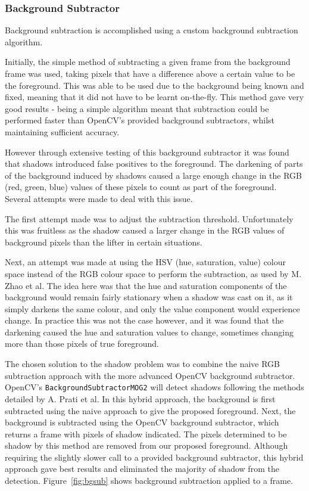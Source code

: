 \subsubsection{Background Subtractor}
\label{subsec:bgsub}

Background subtraction is accomplished using a custom background subtraction algorithm.

Initially, the simple method of subtracting a given frame from the background frame was used, taking pixels that have a difference above a certain value to be the foreground. This was able to be used due to the background being known and fixed, meaning that it did not have to be learnt on-the-fly. This method gave very good results - being a simple algorithm meant that subtraction could be performed faster than OpenCV's provided background subtractors, whilst maintaining sufficient accuracy.

However through extensive testing of this background subtractor it was found that shadows introduced false positives to the foreground. The darkening of parts of the background induced by shadows caused a large enough change in the RGB (red, green, blue) values of these pixels to count as part of the foreground. Several attempts were made to deal with this issue.

The first attempt made was to adjust the subtraction threshold. Unfortunately this was fruitless as the shadow caused a larger change in the RGB values of background pixels than the lifter in certain situations.

Next, an attempt was made at using the HSV (hue, saturation, value) colour space instead of the RGB colour space to perform the subtraction, as used by M. Zhao et al\cite{bgsubhsv}. The idea here was that the hue and saturation components of the background would remain fairly stationary when a shadow was cast on it, as it simply darkens the same colour, and only the value component would experience change. In practice this was not the case however, and it was found that the darkening caused the hue and saturation values to change, sometimes changing more than those pixels of true foreground.

The chosen solution to the shadow problem was to combine the naive RGB subtraction approach with the more advanced OpenCV background subtractor. OpenCV's \texttt{Background\allowbreak SubtractorMOG2} will detect shadows following the methods detailed by A. Prati et al\cite{bgsubmog2}. In this hybrid approach, the background is first subtracted using the naive approach to give the proposed foreground. Next, the background is subtracted using the OpenCV background subtractor, which returns a frame with pixels of shadow indicated. The pixels determined to be shadow by this method are removed from our proposed foreground. Although requiring the slightly slower call to a provided background subtractor, this hybrid approach gave best results and eliminated the majority of shadow from the detection. Figure~\ref{fig:bgsub} shows background subtraction applied to a frame.

